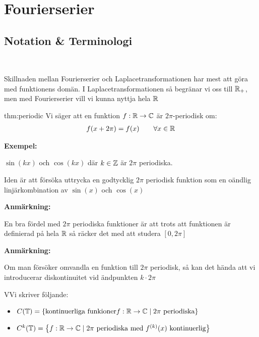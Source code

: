 \section{Fourierserier}\par
\subsection{Notation \& Terminologi}\hfill\\\par
\noindent Skillnaden mellan Fourierserier och Laplacetransformationen har mest att göra med funktionens domän. I Laplacetransformationen så begränar vi oss till $\mathbb{R}_+$, men med Fourierserier vill vi kunna nyttja hela $\mathbb{R}$
\par\bigskip
\begin{theo}{thm:periodic}
  Vi säger att en funktion $f:\mathbb{R}\to\mathbb{C}$ är $2\pi$-periodisk om:
  \begin{equation*}
    \begin{gathered}
      f(x+2\pi) = f(x)\qquad\forall x\in\mathbb{R}
    \end{gathered}
  \end{equation*}
\end{theo}
\par\bigskip
\noindent\textbf{Exempel:}\par
\noindent $\sin(kx)$ och $\cos(kx)$ där $k\in\mathbb{Z}$ är $2\pi$ periodiska.
\par\bigskip
\noindent Iden är att försöka uttrycka en godtycklig $2\pi$ periodisk funktion som en oändlig linjärkombination av $\sin(x)$ och $\cos(x)$
\par\bigskip
\noindent\textbf{Anmärkning:}\par
\noindent En bra fördel med $2\pi$ periodiska funktioner är att trots att funktionen är definierad på hela $\mathbb{R}$ så räcker det med att studera $[0,2\pi]$
\par\bigskip
\noindent\textbf{Anmärkning:}\par
\noindent Om man försöker omvandla en funktion till $2\pi$ periodisk, så kan det hända att vi introducerar diskontinuitet vid ändpunkten $k\cdot2\pi$
\par\bigskip
\begin{theo}
  VVi skriver följande:\par
  \begin{itemize}
  \item $C(\mathbb{T}) = \left\{\text{kontinuerliga funkioner} f:\mathbb{R}\to\mathbb{C}\;|\; 2\pi\text{ periodiska}\right\}$\par
  \item $C^k(\mathbb{T}) = \left\{f:\mathbb{R}\to\mathbb{C}\;|\;2\pi\text{ periodiska med } f^{(k)}(x)\text{ kontinuerlig}\right\}$
  \end{itemize}
\end{theo}

